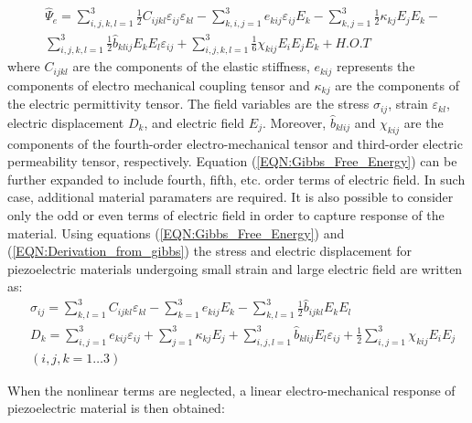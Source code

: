 \begin{equation}
\begin{aligned}
&\hat{\Psi}_e=
\sum_{i,j,k,l=1}^{3} \frac{1}{2}C_{ijkl}{\varepsilon _{ij}}{\varepsilon _{kl}}-
\sum_{k,i,j=1}^3 e_{kij}\varepsilon _{ij}E_k-
\sum_{k,j=1}^3 \frac{1}{2}\kappa _{kj}{E_j}{E_k}-\\
&
\sum_{i,j,k,l=1}^3 \frac{1}{2}\hat{b}_{klij}{E_k}{E_l}\varepsilon _{ij}+
\sum_{i,j,k,l=1}^3 \frac{1}{6}\chi_{kij}{E_i}{E_j}{E_k}+H.O.T
\end{aligned}
\label{EQN:Gibbs_Free_Energy}
\end{equation}
where $C_{ijkl}$ are the components of the elastic stiffness, $e_{kij}$ represents the components of electro mechanical coupling tensor and $\kappa _{kj}$ are the components of the electric permittivity tensor. The field variables are the stress $\sigma _{ij}$, strain $\varepsilon _{kl}$, electric displacement $D_k$, and electric field $E_j$.
Moreover, $\hat{b}_{klij}$ and $\chi_{kij}$ are the components of the fourth-order electro-mechanical tensor and third-order electric permeability tensor, respectively. 
Equation  (\ref{EQN:Gibbs_Free_Energy}) can be further expanded to include fourth, fifth, etc. order terms of electric field.
In such case, additional material paramaters are required.
It is also possible to consider only the odd or even terms of electric field in order to capture response of the material.
Using equations  (\ref{EQN:Gibbs_Free_Energy}) and (\ref{EQN:Derivation_from_gibbs}) the stress and electric displacement for piezoelectric materials undergoing small strain and large electric field are written as:
\\
 
\begin{equation}
\begin{aligned}
&\sigma _{ij} = 
\sum_{k,l=1}^3 {C_{ijkl}}{\varepsilon _{kl}} - 
\sum_{k=1}^3 e_{kij}{E_k} -
\sum_{k,l=1}^3 \frac{1}{2}\hat{b}_{ijkl}{E_k}{E_l}\\
&{D_k} =  
\sum_{i,j=1}^3 {e_{kij}}{\varepsilon _{ij}} + 
\sum_{j=1}^3 {\kappa _{kj}}{E_j}+
\sum_{i,j,l=1}^3 \hat{b}_{klij}{E_l}\varepsilon _{ij}+
\frac{1}{2} 
\sum_{i,j=1}^3 \chi_{kij}{E_i}{E_j} \\
& (i,j,k=1 \dots 3)  
\end{aligned}
\label{EQN:Non_Linear_Constitutive_Relation}
\end{equation}

When the nonlinear terms are neglected, a linear electro-mechanical response of piezoelectric material \cite{Leo2007} is then obtained:

